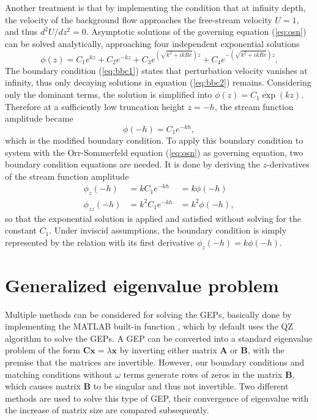 Another treatment is that by implementing the condition that at infinity depth, the velocity of the background flow approaches the free-stream velocity $U=1$, and thus $d^2U/dz^2=0$. Asymptotic solutions of the governing equation (\ref{eq:osn}) can be solved analytically, approaching four independent exponential solutions
\begin{equation}
    \phi (z) =C_{1} e^{kz} +C_{2} e^{-kz} +C_{3} e^{\left(\sqrt{k^{2} +ikRe}\right) z} +C_{4} e^{-\left(\sqrt{k^{2} +ikRe}\right) z}.
    \label{eq:bbc2}
\end{equation}
The boundary condition (\ref{eq:bbc1}) states that perturbation velocity vanishes at infinity, thus only decaying solutions in equation (\ref{eq:bbc2}) remains. Considering only the dominant terms, the solution is simplified into $\phi(z)=C_1\exp(kz)$. Therefore at a sufficiently low truncation height $z=-h$, the stream function amplitude became
\begin{equation}
    \phi(-h)=C_1 e^{-kh},
    \label{eq:bbc3}
\end{equation}  
which is the modified boundary condition. To apply this boundary condition to system with the Orr-Sommerfeld equation (\ref{eq:osn}) as governing equation, two boundary condition equations are needed. It is done by deriving the $z$-derivatives of the stream function amplitude
\begin{equation}
\begin{array}{lll}
    \phi_{z}(-h) &= k C_1e^{-kh}&=k\phi\left(-h\right)\\
    \phi_{zz}(-h)&= k^2C_1e^{-kh}&=k^2\phi\left(-h\right),
\end{array}
    \label{eq:bbced}
\end{equation}
so that the exponential solution is applied and satisfied without solving for the constant $C_1$. Under inviscid assumptions, the boundary condition is simply represented by the relation with its first derivative $\phi_{z}(-h) =k\phi(-h)$.

\section{Generalized eigenvalue problem}
Multiple methods can be considered for solving the GEPs, basically done by implementing the MATLAB built-in function , which by default uses the QZ algorithm to solve the GEPs. A GEP can be converted into a standard eigenvalue problem of the form $\boldsymbol{Cx}=\lambda\boldsymbol{x}$ by inverting either matrix $\boldsymbol{A}$ or $\boldsymbol{B}$, with the premise that the matrices are invertible. However, our boundary conditions and matching conditions without $\omega$ terms generate rows of zeros in the matrix $\boldsymbol{B}$, which causes matrix $\boldsymbol{B}$ to be singular and thus not invertible. Two different methods are used to solve this type of GEP, their convergence of eigenvalue with the increase of matrix size are compared subsequently.

